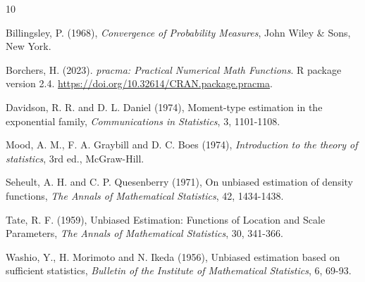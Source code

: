 \documentclass[12pt]{article}
\theoremstyle{definition}
\begin{document}
\begin{thebibliography}{10}

{Billingsley, P.} (1968),
{\it Convergence of Probability Measures}, John Wiley \& Sons, New
York.

{Borchers, H.} (2023).
{\it pracma: Practical Numerical Math Functions}. R package version 2.4.
\url{https://doi.org/10.32614/CRAN.package.pracma}.

{Davidson, R. R.} and D. L. {Daniel} (1974), 
Moment-type estimation in the exponential family,
{\it Communications in Statistics}, {3}, 1101-1108.

{Mood, A. M.,  F. A. Graybill} and {D. C. Boes} (1974),
{\it Introduction to the theory of statistics}, 3rd ed., McGraw-Hill.

{Seheult, A. H.} and {C. P. Quesenberry} (1971),
On unbiased estimation of density functions,
{\it The Annals of Mathematical Statistics}, {42}, 1434-1438. %

{Tate, R. F.} (1959),
Unbiased Estimation: Functions of Location and Scale Parameters,
{\it The Annals of Mathematical Statistics}, {30}, 341-366. %

{Washio, Y., H. Morimoto} and { N. Ikeda} (1956),
Unbiased estimation based on sufficient statistics,
{\it Bulletin of the Institute of Mathematical Statistics}, {6}, 69-93. 





\end{thebibliography}
\end{document}
